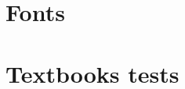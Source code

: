 \documentclass[output=book
	      ,nonflat
	      ,modfonts
	      ]{langsci/langscibook}
\begin{document}
\section{Fonts}



% 
% 
%  
%  
% 
% 
%  
\section{Textbooks tests}
%  
%  

%  

\end{document}
